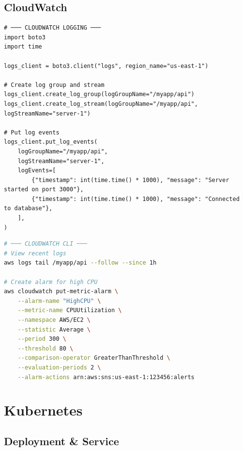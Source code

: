 \documentclass[10pt, a4paper]{article}
\begin{document}
\subsection{CloudWatch}


\begin{lstlisting}[language=mypython]
# ─── CLOUDWATCH LOGGING ───
import boto3
import time

logs_client = boto3.client("logs", region_name="us-east-1")

# Create log group and stream
logs_client.create_log_group(logGroupName="/myapp/api")
logs_client.create_log_stream(logGroupName="/myapp/api", logStreamName="server-1")

# Put log events
logs_client.put_log_events(
    logGroupName="/myapp/api",
    logStreamName="server-1",
    logEvents=[
        {"timestamp": int(time.time() * 1000), "message": "Server started on port 3000"},
        {"timestamp": int(time.time() * 1000), "message": "Connected to database"},
    ],
)
\end{lstlisting}


\begin{lstlisting}[language=bash]
# ─── CLOUDWATCH CLI ───
# View recent logs
aws logs tail /myapp/api --follow --since 1h

# Create alarm for high CPU
aws cloudwatch put-metric-alarm \
    --alarm-name "HighCPU" \
    --metric-name CPUUtilization \
    --namespace AWS/EC2 \
    --statistic Average \
    --period 300 \
    --threshold 80 \
    --comparison-operator GreaterThanThreshold \
    --evaluation-periods 2 \
    --alarm-actions arn:aws:sns:us-east-1:123456:alerts
\end{lstlisting}


\bigskip


\section{Kubernetes}


\subsection{Deployment \& Service}
\end{document}
